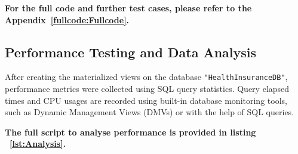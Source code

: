    \vspace{.4cm}
  


  

\textbf{For the full code and further test cases, please refer to the Appendix~\ref{fullcode:Fullcode}.}


\subsection{Performance Testing and Data Analysis} After creating the materialized views on the database \texttt{"HealthInsuranceDB"}, performance metrics were collected using SQL query statistics. Query elapsed times and CPU usages are recorded using built-in database monitoring tools, such as Dynamic Management Views (DMVs) or with the help of SQL queries. \vspace{.4cm}

 

 \textbf{The full script to analyse performance is provided in listing ~\ref{lst:Analysis}.}

